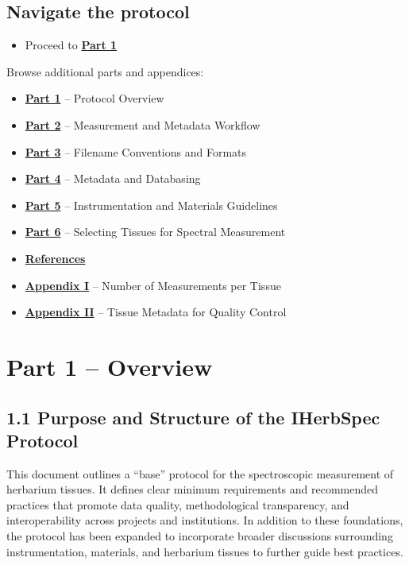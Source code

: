\documentclass[
  letterpaper,
  DIV=11,
  numbers=noendperiod]{scrreprt}
\providecommand{\tightlist}{%
  \setlength{\itemsep}{0pt}\setlength{\parskip}{0pt}}
\begin{document}
\section{Navigate the protocol}\label{navigate-the-protocol}

\begin{itemize}
\tightlist
\item
  Proceed to \hyperref[part1]{\textbf{Part 1}}
\end{itemize}

Browse additional parts and appendices:

\begin{itemize}
\tightlist
\item
  \hyperref[part1]{\textbf{Part 1}} -- Protocol Overview
\item
  \hyperref[part2]{\textbf{Part 2}} -- Measurement and Metadata Workflow
\item
  \hyperref[part3]{\textbf{Part 3}} -- Filename Conventions and Formats
\item
  \hyperref[part4]{\textbf{Part 4}} -- Metadata and Databasing
\item
  \hyperref[part5]{\textbf{Part 5}} -- Instrumentation and Materials
  Guidelines
\item
  \hyperref[part6]{\textbf{Part 6}} -- Selecting Tissues for Spectral
  Measurement
\item
  \hyperref[references]{\textbf{References}}
\item
  \hyperref[app1]{\textbf{Appendix I}} -- Number of Measurements per
  Tissue
\item
  \hyperref[app2]{\textbf{Appendix II}} -- Tissue Metadata for Quality
  Control
\end{itemize}


\chapter{Part 1 -- Overview}\label{part-1-overview}

\section{1.1 Purpose and Structure of the IHerbSpec
Protocol}\label{part1}

This document outlines a ``base'' protocol for the spectroscopic
measurement of herbarium tissues. It defines clear minimum requirements
and recommended practices that promote data quality, methodological
transparency, and interoperability across projects and institutions. In
addition to these foundations, the protocol has been expanded to
incorporate broader discussions surrounding instrumentation, materials,
and herbarium tissues to further guide best practices.
\end{document}
